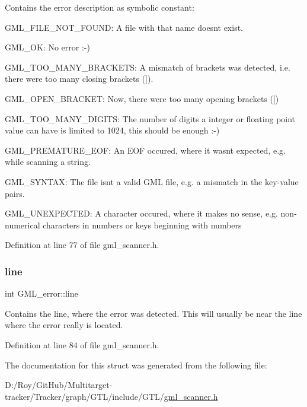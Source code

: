 Contains the error description as symbolic constant\+: 
\begin{DoxyItemize}
\item {\ttfamily G\+M\+L\+\_\+\+F\+I\+L\+E\+\_\+\+N\+O\+T\+\_\+\+F\+O\+U\+ND}\+: A file with that name doesn\textquotesingle{}t exist. 
\item {\ttfamily G\+M\+L\+\_\+\+OK}\+: No error \+:-\/) 
\item {\ttfamily G\+M\+L\+\_\+\+T\+O\+O\+\_\+\+M\+A\+N\+Y\+\_\+\+B\+R\+A\+C\+K\+E\+TS}\+: A mismatch of brackets was detected, i.\+e. there were too many closing brackets ({\ttfamily \mbox{]}}). 
\item {\ttfamily G\+M\+L\+\_\+\+O\+P\+E\+N\+\_\+\+B\+R\+A\+C\+K\+ET}\+: Now, there were too many opening brackets ({\ttfamily \mbox{[}}) 
\item {\ttfamily G\+M\+L\+\_\+\+T\+O\+O\+\_\+\+M\+A\+N\+Y\+\_\+\+D\+I\+G\+I\+TS}\+: The number of digits a integer or floating point value can have is limited to 1024, this should be enough \+:-\/) 
\item {\ttfamily G\+M\+L\+\_\+\+P\+R\+E\+M\+A\+T\+U\+R\+E\+\_\+\+E\+OF}\+: An E\+OF occured, where it wasn\textquotesingle{}t expected, e.\+g. while scanning a string. 
\item {\ttfamily G\+M\+L\+\_\+\+S\+Y\+N\+T\+AX}\+: The file isn\textquotesingle{}t a valid G\+ML file, e.\+g. a mismatch in the key-\/value pairs. 
\item {\ttfamily G\+M\+L\+\_\+\+U\+N\+E\+X\+P\+E\+C\+T\+ED}\+: A character occured, where it makes no sense, e.\+g. non-\/numerical characters in numbers or keys beginning with numbers 
\end{DoxyItemize}

Definition at line 77 of file gml\+\_\+scanner.\+h.

\mbox{\label{struct_g_m_l__error_a4e9d11b6501f91a982af87f45962b7b3}} 
\subsubsection{\texorpdfstring{line}{line}}
{\footnotesize\ttfamily int G\+M\+L\+\_\+error\+::line}

Contains the line, where the error was detected. This will usually be near the line where the error really is located. 

Definition at line 84 of file gml\+\_\+scanner.\+h.



The documentation for this struct was generated from the following file\+:\begin{DoxyCompactItemize}
\item 
D\+:/\+Roy/\+Git\+Hub/\+Multitarget-\/tracker/\+Tracker/graph/\+G\+T\+L/include/\+G\+T\+L/\mbox{\hyperlink{gml__scanner_8h}{gml\+\_\+scanner.\+h}}\end{DoxyCompactItemize}
